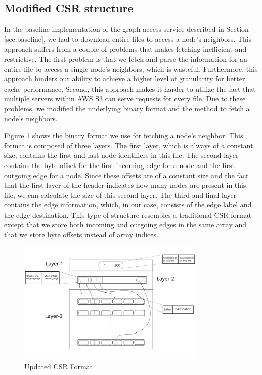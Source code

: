\subsection{Modified CSR structure}\label{sec:modifiedCsr}
In the baseline implementation of the graph access service described in
Section \ref{sec:baseline}, we had to download entire files to access
a node's neighbors. This approach suffers from a couple of problems that makes
fetching inefficient and restrictive. The first problem is that we
fetch and parse the information for an entire file to access a single
node's neighbors, which is wasteful. Furthermore, this approach hinders our
ability to achieve a higher level of granularity for better cache performance.
Second, this approach makes it harder to utilize the fact that multiple servers
within AWS S3 can serve requests for every file. Due to these problems, we modified the
underlying binary format and the method to fetch a node's neighbors.

\medskip
Figure \ref{fig:csrFormat} shows the binary format we use for fetching a
node's neighbor. This format is composed of three layers. The
first layer, which is always of a constant size, contains the first and last
node identifiers in this file. The second layer contains the byte offset
for the first incoming edge for a node and the first outgoing edge for a node.
Since these offsets are of a constant size and the fact that the first layer of
the header indicates how many nodes are present in this file, we can calculate
the size of this second layer. The third and final layer contains the edge
information, which, in our case, consists of the edge label and the edge
destination. This type of structure resembles a traditional CSR format
except that we store both incoming and outgoing edges in the same
array and that we store byte offsets instead of array indices.
\begin{figure}[ht]
    \centering
    \includegraphics[width=0.8\textwidth]{figures/csrFormat.png}
    \caption{Updated CSR Format}
    \label{fig:csrFormat}
\end{figure}

